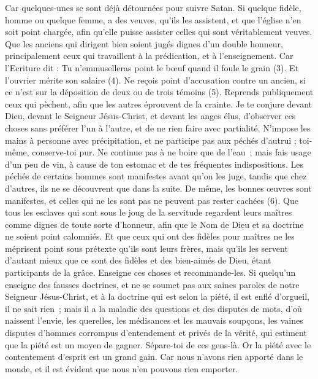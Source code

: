 \begin{multicols}{2}
Car quelques-unes se sont déjà détournées pour suivre Satan.
Si quelque fidèle, homme ou quelque femme, a des veuves, qu'ils les assistent, et que l'église n'en soit point chargée, afin qu’elle puisse assister celles qui sont véritablement veuves.
Que les anciens qui dirigent bien soient jugés dignes d'un double honneur, principalement ceux qui travaillent à la prédication, et à l’enseignement.
Car l’Ecriture dit : Tu n’emmuselleras point le bœuf quand il foule le grain (3). Et l'ouvrier mérite son salaire (4).
Ne reçois point d'accusation contre un ancien, si ce n’est sur la déposition de deux ou de trois témoins (5).
Reprends publiquement ceux qui pèchent, afin que les autres éprouvent de la crainte.
Je te conjure devant Dieu, devant le Seigneur Jésus-Christ, et devant les anges élus, d’observer ces choses sans préférer l'un à l'autre, et de ne rien faire avec partialité.
N'impose les mains à personne avec précipitation, et ne participe pas aux péchés d'autrui ; toi-même, conserve-toi pur.
Ne continue pas à ne boire que de l’eau ; mais fais usage d’un peu de vin, à cause de ton estomac et de tes fréquentes indispositions.
Les péchés de certains hommes sont manifestes avant qu’on les juge, tandis que chez d’autres, ils ne se découvrent que dans la suite.
De même, les bonnes œuvres sont manifestes, et celles qui ne les sont pas ne peuvent pas rester cachées (6).
\VerseOne{}Que tous les esclaves qui sont sous le joug de la servitude regardent leurs maîtres comme dignes de toute sorte d'honneur, afin que le Nom de Dieu et sa doctrine ne soient point calomniés.
Et que ceux qui ont des fidèles pour maîtres ne les méprisent point sous prétexte qu'ils sont leurs frères, mais qu’ils les servent d’autant mieux que ce sont des fidèles et des bien-aimés de Dieu, étant participants de la grâce. Enseigne ces choses et recommande-les.
Si quelqu'un enseigne des fausses doctrines, et ne se soumet pas aux saines paroles de notre Seigneur Jésus-Christ, et à la doctrine qui est selon la piété,
il est enflé d'orgueil, il ne sait rien ; mais il a la maladie des questions et des disputes de mots, d'où naissent l’envie, les querelles, les médisances et les mauvais soupçons,
les vaines disputes d'hommes corrompus d'entendement et privés de la vérité, qui estiment que la piété est un moyen de gagner. Sépare-toi de ces gens-là.
Or la piété avec le contentement d'esprit est un grand gain.
Car nous n'avons rien apporté dans le monde, et il est évident que nous n'en pouvons rien emporter.

\end{multicols}
